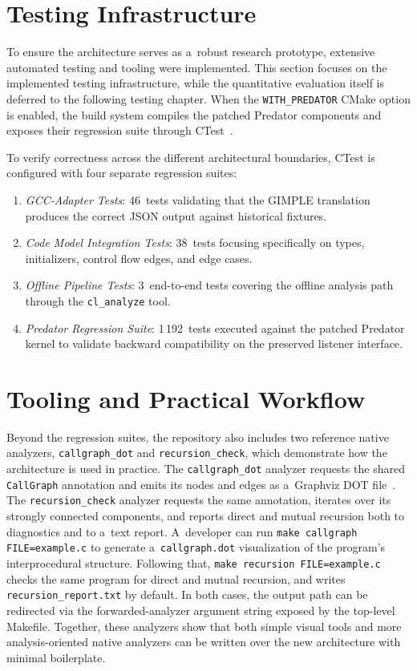 \documentclass[xpsejal00-gcc-plugin.tex]{subfiles}
\begin{document}
\section{Testing Infrastructure}\label{sec:testing}

To ensure the architecture serves as a~robust research prototype, extensive automated testing and tooling were implemented.
This section focuses on the implemented testing infrastructure, while the quantitative evaluation itself is deferred to the following testing chapter.
When the \texttt{WITH\_PREDATOR} CMake option is enabled, the build system compiles the patched Predator components and exposes their regression suite through CTest~\cite{CMake}.

To verify correctness across the different architectural boundaries, CTest is configured with four separate regression suites:
\begin{enumerate}
  \item \textit{GCC-Adapter Tests}: 46~tests validating that the GIMPLE translation produces the correct JSON output against historical fixtures.
  \item \textit{Code Model Integration Tests}: 38~tests focusing specifically on types, initializers, control flow edges, and edge cases.
  \item \textit{Offline Pipeline Tests}: 3~end-to-end tests covering the offline analysis path through the \texttt{cl\_analyze} tool.
  \item \textit{Predator Regression Suite}: 1\,192~tests executed against the patched Predator kernel to validate backward compatibility on the preserved listener interface.
\end{enumerate}

\section{Tooling and Practical Workflow}\label{sec:tooling-workflow}

Beyond the regression suites, the repository also includes two reference native analyzers, \texttt{callgraph\_dot} and \texttt{recursion\_check}, which demonstrate how the architecture is used in practice.
The \texttt{callgraph\_dot} analyzer requests the shared \texttt{CallGraph} annotation and emits its nodes and edges as a~Graphviz DOT file~\cite{Graphviz}.
The \texttt{recursion\_check} analyzer requests the same annotation, iterates over its strongly connected components, and reports direct and mutual recursion both to diagnostics and to a~text report.
A~developer can run \texttt{make callgraph FILE=example.c} to generate a~\texttt{callgraph.dot} visualization of the program's interprocedural structure.
Following that, \texttt{make recursion FILE=example.c} checks the same program for direct and mutual recursion, and writes \texttt{recursion\_report.txt} by default.
In both cases, the output path can be redirected via the forwarded-analyzer argument string exposed by the top-level Makefile.
Together, these analyzers show that both simple visual tools and more analysis-oriented native analyzers can be written over the new architecture with minimal boilerplate.
\end{document}
